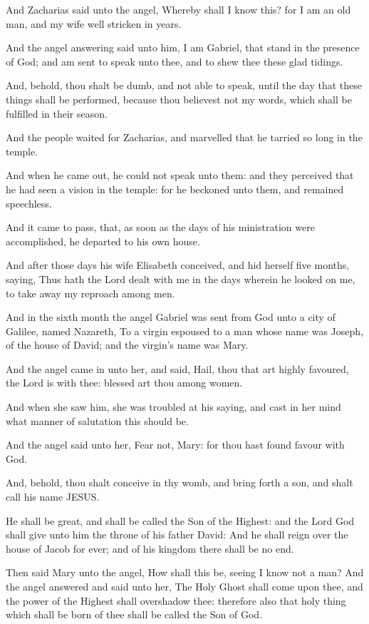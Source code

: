\verse And Zacharias said unto the angel, Whereby shall I know this? for I am an old man, and my wife well stricken in years.

\verse And the angel answering said unto him, I am Gabriel, that stand in the presence of God; and am sent to speak unto thee, and to shew thee these glad tidings.

\verse And, behold, thou shalt be dumb, and not able to speak, until the day that these things shall be performed, because thou believest not my words, which shall be fulfilled in their season.

\verse And the people waited for Zacharias, and marvelled that he tarried so long in the temple.

\verse And when he came out, he could not speak unto them: and they perceived that he had seen a vision in the temple: for he beckoned unto them, and remained speechless.

\verse And it came to pass, that, as soon as the days of his ministration were accomplished, he departed to his own house.

\verse And after those days his wife Elisabeth conceived, and hid herself five months, saying, \verse Thus hath the Lord dealt with me in the days wherein he looked on me, to take away my reproach among men.

\verse And in the sixth month the angel Gabriel was sent from God unto a city of Galilee, named Nazareth, \verse To a virgin espoused to a man whose name was Joseph, of the house of David; and the virgin's name was Mary.

\verse And the angel came in unto her, and said, Hail, thou that art highly favoured, the Lord is with thee: blessed art thou among women.

\verse And when she saw him, she was troubled at his saying, and cast in her mind what manner of salutation this should be.

\verse And the angel said unto her, Fear not, Mary: for thou hast found favour with God.

\verse And, behold, thou shalt conceive in thy womb, and bring forth a son, and shalt call his name JESUS.

\verse He shall be great, and shall be called the Son of the Highest: and the Lord God shall give unto him the throne of his father David: \verse And he shall reign over the house of Jacob for ever; and of his kingdom there shall be no end.

\verse Then said Mary unto the angel, How shall this be, seeing I know not a man?  \verse And the angel answered and said unto her, The Holy Ghost shall come upon thee, and the power of the Highest shall overshadow thee: therefore also that holy thing which shall be born of thee shall be called the Son of God.

